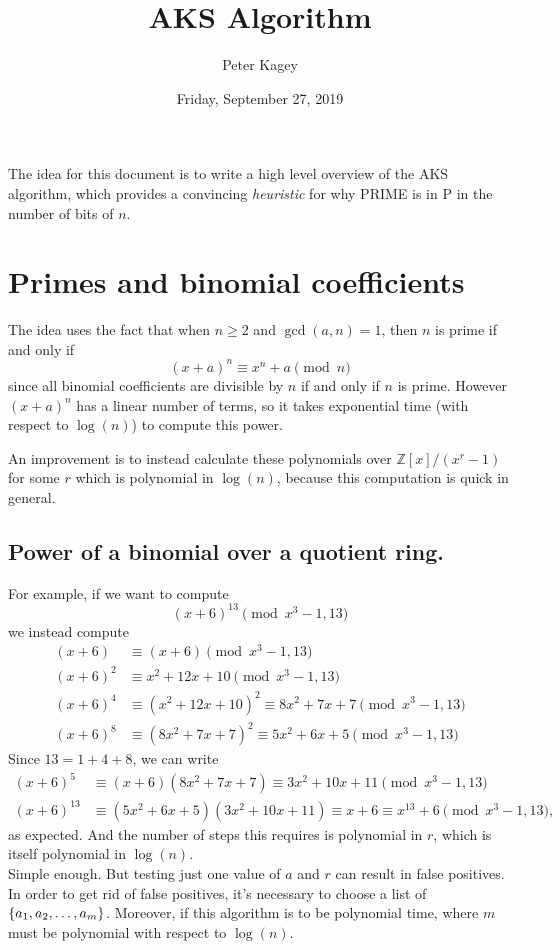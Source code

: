 \documentclass{article}
\begin{document}
\title{AKS Algorithm}
\author{Peter Kagey}
\date{Friday, September 27, 2019}

\maketitle

The idea for this document is to write a high level overview of the AKS
algorithm, which provides a convincing \textit{heuristic} for why PRIME is in P
in the number of bits of $n$.
\section{Primes and binomial coefficients}
The idea uses the fact that when $n \geq 2$ and $\gcd(a, n) = 1$, then $n$ is
prime if and only if \[
  (x+a)^n \equiv x^n + a \pmod n
\] since all binomial coefficients are divisible by $n$ if and only if $n$ is
prime. However $(x+a)^n$ has a linear number of terms, so it takes exponential
time (with respect to $\log(n)$) to compute this power.

An improvement is to instead calculate these polynomials over
$\mathbb Z[x]/(x^r - 1)$ for some $r$ which is polynomial in $\log(n)$, because
this computation is quick in general.

\subsection{Power of a binomial over a quotient ring.}
For example, if we want to compute \[
  (x + 6)^{13} \pmod{x^3-1, 13}
\] we instead compute \begin{align*}
  (x + 6) &\equiv (x + 6) \pmod{x^3-1, 13} \\
  (x + 6)^2 &\equiv x^2 + 12x + 10 \pmod{x^3-1, 13} \\
  (x + 6)^4 &\equiv (x^2 + 12x + 10)^2 \equiv 8 x^2 + 7 x + 7 \pmod{x^3-1, 13} \\
  (x + 6)^8 &\equiv (8 x^2 + 7 x + 7)^2 \equiv 5 x^2 + 6 x + 5 \pmod{x^3-1, 13}
\end{align*}
Since $13 = 1 + 4 + 8$, we can write \begin{align*}
  (x + 6)^5 &\equiv (x + 6)(8 x^2 + 7 x + 7) \equiv 3 x^2 + 10 x + 11 \pmod{x^3-1, 13} \\
  (x + 6)^{13} &\equiv (5 x^2 + 6 x + 5)(3 x^2 + 10 x + 11) \equiv x + 6 \equiv x^{13} + 6 \pmod{x^3-1, 13},
  \end{align*} as expected.
And the number of steps this requires is polynomial in $r$, which is itself
polynomial in $\log(n)$.
\\
Simple enough. But testing just one value of $a$ and $r$ can result in false
positives. In order to get rid of false positives, it's necessary to choose a
list of $\left\{ a_1, a_2, \hdots, a_m \right\}$. Moreover, if this algorithm is to be
polynomial time, where $m$ must be polynomial with respect to $\log(n)$.
\end{document}
